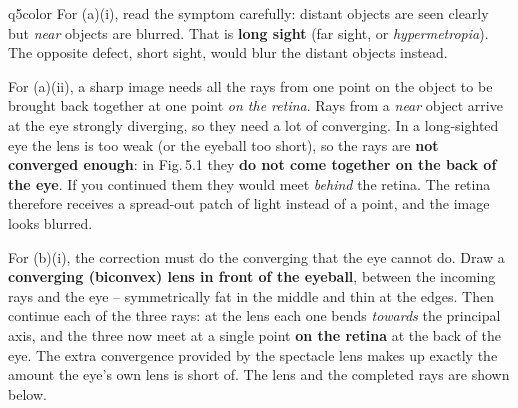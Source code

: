 \documentclass[11pt,a4paper]{article}
\begin{document}
\begin{ansbox}{q5color}
For (a)(i), read the symptom carefully: distant objects are seen clearly but \emph{near} objects are blurred. That is \textbf{long sight} (far sight, or \emph{hypermetropia}). The opposite defect, short sight, would blur the distant objects instead.

For (a)(ii), a sharp image needs all the rays from one point on the object to be brought back together at one point \emph{on the retina}. Rays from a \emph{near} object arrive at the eye strongly diverging, so they need a lot of converging. In a long-sighted eye the lens is too weak (or the eyeball too short), so the rays are \textbf{not converged enough}: in Fig.\,5.1 they \textbf{do not come together on the back of the eye}. If you continued them they would meet \emph{behind} the retina. The retina therefore receives a spread-out patch of light instead of a point, and the image looks blurred.

For (b)(i), the correction must do the converging that the eye cannot do. Draw a \textbf{converging (biconvex) lens in front of the eyeball}, between the incoming rays and the eye -- symmetrically fat in the middle and thin at the edges. Then continue each of the three rays: at the lens each one bends \emph{towards} the principal axis, and the three now meet at a single point \textbf{on the retina} at the back of the eye. The extra convergence provided by the spectacle lens makes up exactly the amount the eye's own lens is short of. The lens and the completed rays are shown below.
\begin{center}
\end{center}


\end{ansbox}
\end{document}
